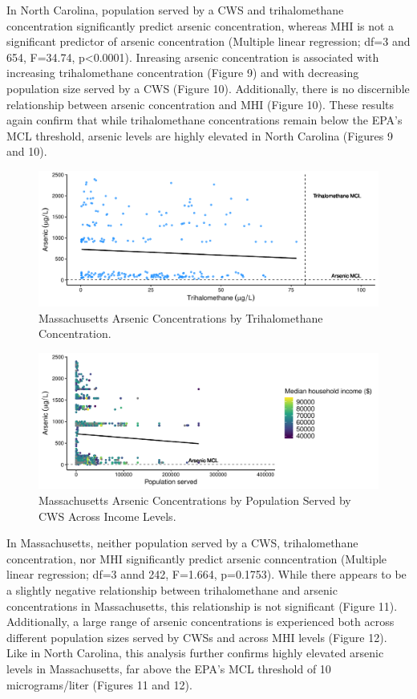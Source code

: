 \documentclass[12pt,]{article}
\begin{document}
In North Carolina, population served by a CWS and trihalomethane
concentration significantly predict arsenic concentration, whereas MHI
is not a significant predictor of arsenic concentration (Multiple linear
regression; df=3 and 654, F=34.74, p\textless{}0.0001). Inreasing
arsenic concentration is associated with increasing trihalomethane
concentration (Figure 9) and with decreasing population size served by a
CWS (Figure 10). Additionally, there is no discernible relationship
between arsenic concentration and MHI (Figure 10). These results again
confirm that while trihalomethane concentrations remain below the EPA's
MCL threshold, arsenic levels are highly elevated in North Carolina
(Figures 9 and 10).

\begin{figure}
\centering
\includegraphics{Project_Template_files/figure-latex/figs11-1.pdf}
\caption{Massachusetts Arsenic Concentrations by Trihalomethane
Concentration.}
\end{figure}

\begin{figure}
\centering
\includegraphics{Project_Template_files/figure-latex/figs12-1.pdf}
\caption{Massachusetts Arsenic Concentrations by Population Served by
CWS Across Income Levels.}
\end{figure}

In Massachusetts, neither population served by a CWS, trihalomethane
concentration, nor MHI significantly predict arsenic conncentration
(Multiple linear regression; df=3 annd 242, F=1.664, p=0.1753). While
there appears to be a slightly negative relationship between
trihalomethane and arsenic concentrations in Massachusetts, this
relationship is not significant (Figure 11). Additionally, a large range
of arsenic concentrations is experienced both across different
population sizes served by CWSs and across MHI levels (Figure 12). Like
in North Carolina, this analysis further confirms highly elevated
arsenic levels in Massachusetts, far above the EPA's MCL threshold of 10
micrograms/liter (Figures 11 and 12).
\end{document}

